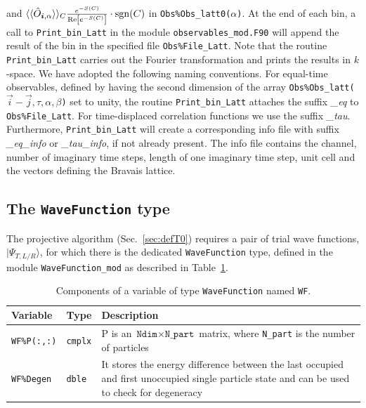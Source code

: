and $ \langle \langle \hat{O}_{\boldsymbol{i},\alpha} \rangle \rangle_{C} \frac{e^{-S(C)}} {\operatorname{Re} \left[e^{-S(C)} \right]}\cdot \allowbreak \operatorname{sgn}(C) $  in \texttt{Obs\%Obs\_latt0($\alpha$)}.   At the end of each bin, a call to \texttt{Print\_bin\_Latt} in the module  \texttt{observables\_mod.F90}   will append the result of the bin in the specified  file \texttt{Obs\%File\_Latt}.   Note that the routine  \texttt{Print\_bin\_Latt}  carries out the Fourier transformation and prints the results in $k$-space. 
We have adopted the following naming conventions.
For equal-time observables, defined by having the second dimension of the array  \texttt{Obs\%Obs\_latt($\vec{i}-\vec{j},\tau,\alpha,\beta$)}   set to unity, 
the routine \texttt{Print\_bin\_Latt}  attaches the suffix \emph{\_eq} to \texttt{Obs\%File\_Latt}.  For time-displaced correlation functions we use the suffix \emph{\_tau}. 
Furthermore, \texttt{Print\_bin\_Latt} will create a corresponding info file with suffix \emph{\_eq\_info} or \emph{\_tau\_info}, if not already present. The info file contains the channel, number of imaginary time steps, length of one imaginary time step, unit cell and the vectors defining the Bravais lattice.

\subsection{The \texttt{WaveFunction} type} \label{sec:wave_function}

The projective algorithm (Sec.~\ref{sec:defT0}) requires a pair of trial wave functions,  $| \Psi_{T,L/R} \rangle $, for which there is the dedicated  \texttt{WaveFunction} type, defined in the module \texttt{WaveFunction\_mod} as described in Table~\ref{table:wavefunction}.
%
\begin{table}[h!]
	\begin{center}
		\begin{tabular}{@{} p{} p{} p{}  @{}}\toprule
			Variable               & Type           &  Description \\\midrule
			\texttt{WF\%P(:,:)}    & \texttt{cmplx} &  P is an $\texttt{Ndim}\times\texttt{N\_part}$ matrix, where \texttt{N\_part} is the number of particles\\
			\texttt{WF\%Degen}     & \texttt{dble}  &  It stores the energy difference between the last occupied and first unoccupied single particle state and can be used to check for degeneracy\\\bottomrule
		\end{tabular}
		\caption{Components of a variable of type \texttt{WaveFunction} named \texttt{WF}.}
		\label{table:wavefunction}
	\end{center}
\end{table}
%

